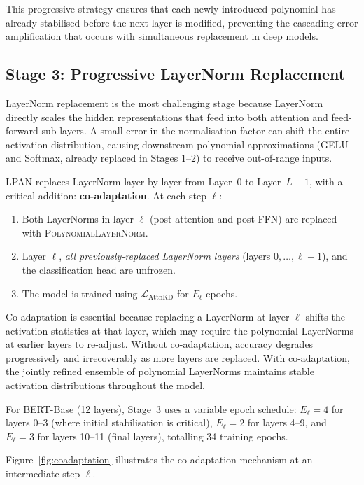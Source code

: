 This progressive strategy ensures that each newly introduced polynomial has already stabilised before the next layer is modified, preventing the cascading error amplification that occurs with simultaneous replacement in deep models.

\subsection{Stage 3: Progressive LayerNorm Replacement}
\label{sec:stage3}

LayerNorm replacement is the most challenging stage because LayerNorm directly scales the hidden representations that feed into both attention and feed-forward sub-layers. A small error in the normalisation factor can shift the entire activation distribution, causing downstream polynomial approximations (GELU and Softmax, already replaced in Stages 1--2) to receive out-of-range inputs.

LPAN replaces LayerNorm layer-by-layer from Layer~0 to Layer~$L-1$, with a critical addition: \textbf{co-adaptation}. At each step $\ell$:
\begin{enumerate}
    \item Both LayerNorms in layer $\ell$ (post-attention and post-FFN) are replaced with \textsc{PolynomialLayerNorm}.
    \item Layer $\ell$, \emph{all previously-replaced LayerNorm layers} (layers $0, \ldots, \ell-1$), and the classification head are unfrozen.
    \item The model is trained using $\mathcal{L}_{\mathrm{AttnKD}}$ for $E_\ell$ epochs.
\end{enumerate}

Co-adaptation is essential because replacing a LayerNorm at layer $\ell$ shifts the activation statistics at that layer, which may require the polynomial LayerNorms at earlier layers to re-adjust. Without co-adaptation, accuracy degrades progressively and irrecoverably as more layers are replaced. With co-adaptation, the jointly refined ensemble of polynomial LayerNorms maintains stable activation distributions throughout the model.

For BERT-Base (12 layers), Stage~3 uses a variable epoch schedule: $E_\ell = 4$ for layers 0--3 (where initial stabilisation is critical), $E_\ell = 2$ for layers 4--9, and $E_\ell = 3$ for layers 10--11 (final layers), totalling 34 training epochs.

Figure~\ref{fig:coadaptation} illustrates the co-adaptation mechanism at an intermediate step $\ell$.


